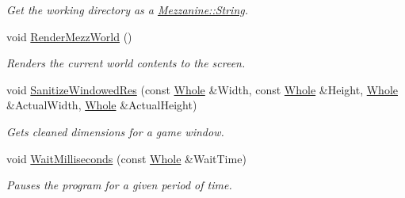 \begin{DoxyCompactItemize}
\begin{DoxyCompactList}\small\item\em Get the working directory as a \hyperlink{namespaceMezzanine_acf9fcc130e6ebf08e3d8491aebcf1c86}{Mezzanine::String}. \item\end{DoxyCompactList}\item 
void \hyperlink{namespaceMezzanine_1_1crossplatform_ab1478e2a8ab7234204a0bc2b17018473}{RenderMezzWorld} ()
\begin{DoxyCompactList}\small\item\em Renders the current world contents to the screen. \item\end{DoxyCompactList}\item 
void \hyperlink{namespaceMezzanine_1_1crossplatform_a339b18b40eced8ea2b3f6e177aa340d0}{SanitizeWindowedRes} (const \hyperlink{namespaceMezzanine_adcbb6ce6d1eb4379d109e51171e2e493}{Whole} \&Width, const \hyperlink{namespaceMezzanine_adcbb6ce6d1eb4379d109e51171e2e493}{Whole} \&Height, \hyperlink{namespaceMezzanine_adcbb6ce6d1eb4379d109e51171e2e493}{Whole} \&ActualWidth, \hyperlink{namespaceMezzanine_adcbb6ce6d1eb4379d109e51171e2e493}{Whole} \&ActualHeight)
\begin{DoxyCompactList}\small\item\em Gets cleaned dimensions for a game window. \item\end{DoxyCompactList}\item 
void \hyperlink{namespaceMezzanine_1_1crossplatform_aedff57a398f195dceb00081475239db4}{WaitMilliseconds} (const \hyperlink{namespaceMezzanine_adcbb6ce6d1eb4379d109e51171e2e493}{Whole} \&WaitTime)
\begin{DoxyCompactList}\small\item\em Pauses the program for a given period of time. \item\end{DoxyCompactList}\end{DoxyCompactItemize}


